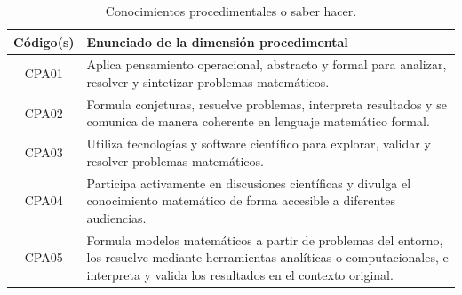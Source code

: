 \documentclass[11pt,a4paper]{article}
\begin{document}
\begin{table}[H]
\centering
\renewcommand{\arraystretch}{1.3}
\begin{tabular}{|c|p{9cm}|}
\hline
\cellcolor[HTML]{00C0F3}\textbf{Código(s)}  & \cellcolor[HTML]{00C0F3}\textbf{Enunciado de la dimensión procedimental} \\
\hline
CPA01 & Aplica pensamiento operacional, abstracto y formal para analizar, resolver y sintetizar problemas matemáticos. \\
\hline
CPA02 & Formula conjeturas, resuelve problemas, interpreta resultados y se comunica de manera coherente en lenguaje matemático formal. \\
\hline
CPA03 & Utiliza tecnologías y software científico para explorar, validar y resolver problemas matemáticos.\\
\hline
CPA04 & Participa activamente en discusiones científicas y divulga el conocimiento matemático de forma accesible a diferentes audiencias.\\
\hline
CPA05 & Formula modelos matemáticos a partir de problemas del entorno, los resuelve mediante herramientas analíticas o computacionales, e interpreta y valida los resultados en el contexto original.\\
\hline
\end{tabular}
\caption{Conocimientos procedimentales o saber hacer.}
\end{table}


\end{document}
